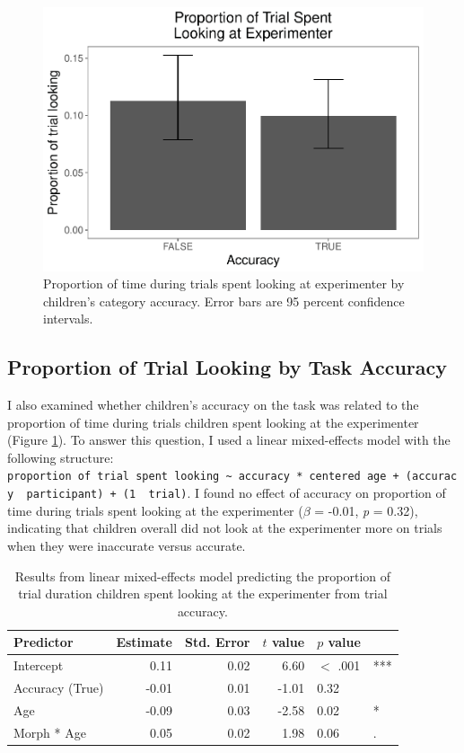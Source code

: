 \documentclass[floatsintext,man]{apa6}
\theoremstyle{definition}
\theoremstyle{definition}
\theoremstyle{definition}
\theoremstyle{remark}
\begin{document}
\begin{figure}
\centering
\includegraphics{soc_ref_category_paper_files/figure-latex/accuracylooking-1.pdf}
\caption{\label{fig:accuracylooking}Proportion of time during trials spent
looking at experimenter by children's category accuracy. Error bars are
95 percent confidence intervals.}
\end{figure}

\subsection{Proportion of Trial Looking by Task
Accuracy}\label{proportion-of-trial-looking-by-task-accuracy}

I also examined whether children's accuracy on the task was related to
the proportion of time during trials children spent looking at the
experimenter (Figure \ref{fig:accuracylooking}). To answer this
question, I used a linear mixed-effects model with the following
structure:
\texttt{proportion\ of\ trial\ spent\ looking\ \textasciitilde{}\ accuracy\ *\ centered\ age\ +\ (accuracy\ \textbar{}\ participant)\ +\ (1\ \textbar{}\ trial)}.
I found no effect of accuracy on proportion of time during trials spent
looking at the experimenter (\(\beta\) = -0.01, \emph{p} = 0.32),
indicating that children overall did not look at the experimenter more
on trials when they were inaccurate versus accurate.

\begin{table}[ht]
\centering
\caption{Results from linear mixed-effects model predicting the proportion of trial duration children spent looking at the experimenter from trial accuracy.} 
\begin{tabular}{lrrrll}
  \hline
Predictor & Estimate & Std. Error & $t$ value & $p$ value &   \\ 
  \hline
Intercept & 0.11 & 0.02 & 6.60 & $<$ .001 & *** \\ 
  Accuracy (True) & -0.01 & 0.01 & -1.01 & 0.32 &  \\ 
  Age & -0.09 & 0.03 & -2.58 & 0.02 & * \\ 
  Morph * Age & 0.05 & 0.02 & 1.98 & 0.06 & . \\ 
   \hline
\end{tabular}
\end{table}
\end{document}
